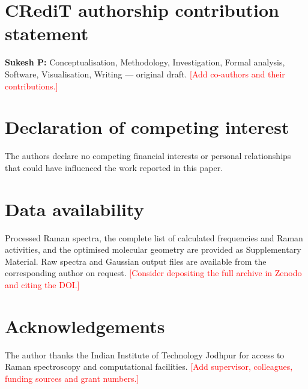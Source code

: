 \documentclass[preprint,12pt]{elsarticle}
\newcommand{\authorcheck}[1]{\textcolor{red}{[#1]}}
\begin{document}
\section*{CRediT authorship contribution statement}
\textbf{Sukesh P:} Conceptualisation, Methodology, Investigation, Formal
analysis, Software, Visualisation, Writing --- original draft.
\authorcheck{Add co-authors and their contributions.}

\section*{Declaration of competing interest}
The authors declare no competing financial interests or personal relationships
that could have influenced the work reported in this paper.

\section*{Data availability}
Processed Raman spectra, the complete list of calculated frequencies and Raman
activities, and the optimised molecular geometry are provided as Supplementary
Material. Raw spectra and Gaussian output files are available from the
corresponding author on request.
\authorcheck{Consider depositing the full archive in Zenodo and citing the DOI.}

\section*{Acknowledgements}
The author thanks the Indian Institute of Technology Jodhpur for access to Raman
spectroscopy and computational facilities.
\authorcheck{Add supervisor, colleagues, funding sources and grant numbers.}
\end{document}
